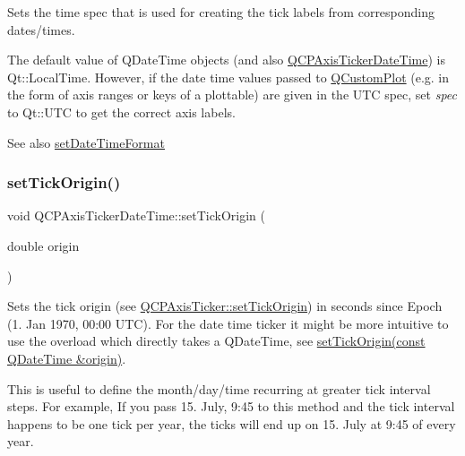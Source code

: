 Sets the time spec that is used for creating the tick labels from corresponding dates/times.

The default value of Q\+Date\+Time objects (and also \hyperlink{classQCPAxisTickerDateTime}{Q\+C\+P\+Axis\+Ticker\+Date\+Time}) is {\ttfamily Qt\+::\+Local\+Time}. However, if the date time values passed to \hyperlink{classQCustomPlot}{Q\+Custom\+Plot} (e.\+g. in the form of axis ranges or keys of a plottable) are given in the U\+TC spec, set {\itshape spec} to {\ttfamily Qt\+::\+U\+TC} to get the correct axis labels.

\begin{DoxySeeAlso}{See also}
\hyperlink{classQCPAxisTickerDateTime_ad52660a82f688395468674d555f6a86b}{set\+Date\+Time\+Format} 
\end{DoxySeeAlso}
\mbox{\label{classQCPAxisTickerDateTime_a5388e048cbd32cf1ba730b9f1859eb5c}} 
\subsubsection{\texorpdfstring{set\+Tick\+Origin()}{setTickOrigin()}\hspace{0.1cm}{\footnotesize\ttfamily [1/2]}}
{\footnotesize\ttfamily void Q\+C\+P\+Axis\+Ticker\+Date\+Time\+::set\+Tick\+Origin (\begin{DoxyParamCaption}\item[{double}]{origin }\end{DoxyParamCaption})}

Sets the tick origin (see \hyperlink{classQCPAxisTicker_ab509c7e500293bf66a8409f0d7c23943}{Q\+C\+P\+Axis\+Ticker\+::set\+Tick\+Origin}) in seconds since Epoch (1. Jan 1970, 00\+:00 U\+TC). For the date time ticker it might be more intuitive to use the overload which directly takes a Q\+Date\+Time, see \hyperlink{classQCPAxisTickerDateTime_a2ea905872b8171847a49a5e093fb0c48}{set\+Tick\+Origin(const Q\+Date\+Time \&origin)}.

This is useful to define the month/day/time recurring at greater tick interval steps. For example, If you pass 15. July, 9\+:45 to this method and the tick interval happens to be one tick per year, the ticks will end up on 15. July at 9\+:45 of every year. \mbox{\label{classQCPAxisTickerDateTime_a2ea905872b8171847a49a5e093fb0c48}} 
